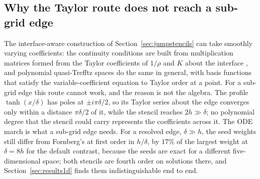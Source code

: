 \documentclass[11pt]{amsart}
\theoremstyle{definition}
\theoremstyle{remark}
\begin{document}
\subsection{Why the Taylor route does not reach a sub-grid edge}
\label{sec:taylor}
The interface-aware construction of Section~\ref{sec:jumpstencils} can
take smoothly varying coefficients: the continuity conditions are built
from multiplication matrices formed from the Taylor coefficients of
$1 / \rho$ and $K$ about the interface \cite{Martin2016,MartinFornberg2017}, and polynomial
quasi-Trefftz spaces \cite{ImbertGerardMoiolaStocker2023} do the same in
general, with basis functions that satisfy the variable-coefficient
equation to Taylor order at a point. For a sub-grid edge this route
cannot work, and the reason is not the algebra. The profile
$\tanh(x / \delta)$ has poles at $\pm i \pi \delta / 2$, so its Taylor
series about the edge converges only within a distance $\pi \delta / 2$
of it, while the stencil reaches $2h \gg \delta$; no polynomial degree
that the stencil could carry represents the coefficients across it. The
ODE march is what a sub-grid edge needs. For a resolved edge,
$\delta \gg h$, the seed weights still differ from Fornberg's at first
order in $h / \delta$, by $17\%$ of the largest weight at $\delta = 8h$
for the default contrast, because the seeds are exact for a different
five-dimensional space; both stencils are fourth order on solutions
there, and Section~\ref{sec:results1d} finds them indistinguishable end
to end.
\end{document}
